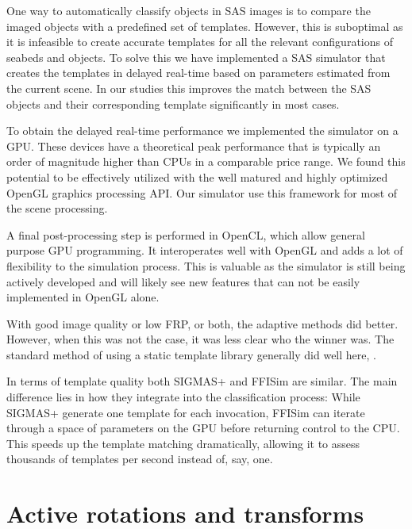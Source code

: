 One way to automatically classify objects in SAS images is to compare the imaged objects with a predefined set of templates. However, this is suboptimal as it is infeasible to create accurate templates for all the relevant configurations of seabeds and objects. To solve this we have implemented a SAS simulator that creates the templates in delayed real-time based on parameters estimated from the current scene. In our studies this improves the match between the SAS objects and their corresponding template significantly in most cases.

To obtain the delayed real-time performance we implemented the simulator on a GPU. These devices have a theoretical peak performance that is typically an order of magnitude higher than CPUs in a comparable price range. We found this potential to be effectively utilized with the well matured and highly optimized OpenGL graphics processing API. Our simulator use this framework for most of the scene processing.

A final post-processing step is performed in OpenCL, which allow general purpose GPU programming. It interoperates well with OpenGL and adds a lot of flexibility to the simulation process. This is valuable as the simulator is still being actively developed and will likely see new features that can not be easily implemented in OpenGL alone.

With good image quality or low FRP, or both, the adaptive methods did better. However, when this was not the case, it was less clear who the winner was. The standard method of using a static template library generally did well here, . 

In terms of template quality both SIGMAS+ and FFISim are similar. The main difference lies in how they integrate into the classification process: While SIGMAS+ generate one template for each invocation, FFISim can iterate through a space of parameters on the GPU before returning control to the CPU. This speeds up the template matching dramatically, allowing it to assess thousands of templates per second instead of, say, one. 
 
%

\ifPhdDoc
\clearpage
\appendix
\renewcommand\thesection{\Roman{section}}
\else
\appendices
\fi

\section{Active rotations and transforms}\label{IV_active_rotations_transforms} 

